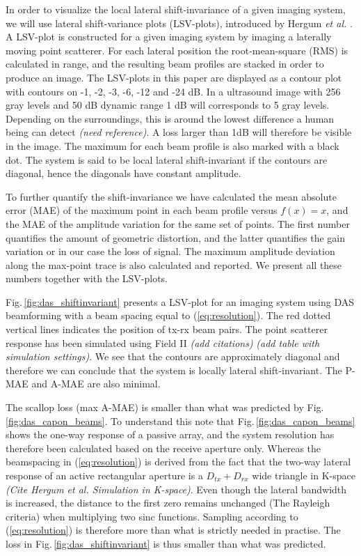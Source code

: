\documentclass[journal]{IEEEtran}
\newcommand\comment[1]{\textit{{\color{red}(#1)}}}
\begin{document}
In order to visualize the local lateral shift-invariance of a given imaging system, we will use lateral shift-variance plots (LSV-plots), introduced by Hergum \textit{et al.} \cite{Hergum2007}. A LSV-plot is constructed for a given imaging system by imaging a laterally moving point scatterer. For each lateral position the root-mean-square (RMS) is calculated in range, and the resulting beam profiles are stacked in order to produce an image. The LSV-plots in this paper are displayed as a contour plot with contours on -1, -2, -3, -6, -12 and -24 dB. In a ultrasound image with 256 gray levels and 50 dB dynamic range 1 dB will corresponds to 5 gray levels. Depending on the surroundings, this is around the lowest difference a human being can detect \comment{need reference}. A loss larger than 1dB will therefore be visible in the image. The maximum for each beam profile is also marked with a black dot. The system is said to be local lateral shift-invariant if the contours are diagonal, hence the diagonals have constant amplitude.

To further quantify the shift-invariance we have calculated the mean absolute error (MAE) of the maximum point in each beam profile versus $f(x)=x$, and the MAE of the amplitude variation for the same set of points. The first number quantifies the amount of geometric distortion, and the latter quantifies the gain variation or in our case the loss of signal. The maximum amplitude deviation along the max-point trace is also calculated and reported. We present all these numbers together with the LSV-plots.

Fig.\,\ref{fig:das_shiftinvariant} presents a LSV-plot for an imaging system using DAS beamforming with a beam spacing equal to (\ref{eq:resolution}). The red dotted vertical lines indicates the position of tx-rx beam pairs. The point scatterer response has been simulated using Field II \comment{add citations} \comment{add table with simulation settings}. We see that the contours are approximately diagonal and therefore we can conclude that the system is locally lateral shift-invariant. The P-MAE and A-MAE are also minimal. 

The scallop loss (max A-MAE) is smaller than what was predicted by Fig.\,\ref{fig:das_capon_beams}. To understand this note that Fig.\,\ref{fig:das_capon_beams} shows the one-way response of a passive array, and the system resolution has therefore been calculated based on the receive aperture only. Whereas the beamspacing in (\ref{eq:resolution}) is derived from the fact that the two-way lateral response of an active rectangular aperture is a $D_{tx}+D_{rx}$ wide triangle in K-space \comment{Cite Hergum et al. Simulation in K-space}. Even though the lateral bandwidth is increased, the distance to the first zero remains unchanged (The Rayleigh criteria) when multiplying two sinc functions. Sampling according to (\ref{eq:resolution}) is therefore more than what is strictly needed in practise. The loss in Fig.\,\ref{fig:das_shiftinvariant} is thus smaller than what was predicted.
\end{document}
